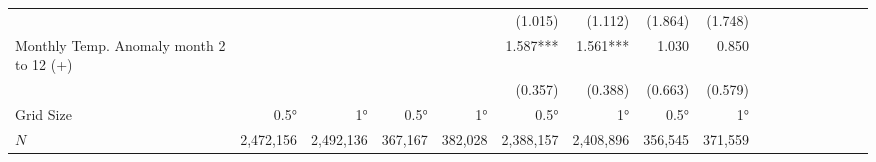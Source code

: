 \begin{table}[H]
\begin{adjustbox}{max width=\linewidth}
\begin{tabular}{lrrrrrrrrrrrrrrrr}
                                             &             &              &             &             &      (1.015) &      (1.112) &      (1.864) &      (1.748) \\
Monthly Temp. Anomaly month 2 to 12 (+)      &             &              &             &             &     1.587*** &     1.561*** &        1.030 &        0.850 \\
                                             &             &              &             &             &      (0.357) &      (0.388) &      (0.663) &      (0.579) \\

\midrule
Grid Size                                   &       0.5° &      1°    &         0.5° &      1°   &      0.5° &     1°    &          0.5° &      1°   \\ 
$N$                                         &   2,472,156 &   2,492,136 &    367,167 &     382,028 &    2,388,157 &    2,408,896 &          356,545 &      371,559  \\ 
\bottomrule
\end{tabular}
\end{adjustbox}
\end{table}